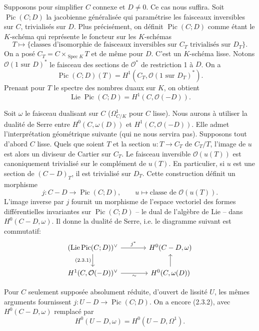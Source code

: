 \documentclass[11pt]{article}
\DeclareMathOperator{\Spec}{Spec}
\DeclareMathOperator{\Lie}{Lie}
\DeclareMathOperator{\Pic}{Pic}
\newcommand{\OO}{\mathcal O}
\newcommand{\dual}{^{\vee}}
\begin{document}
Supposons pour simplifier $C$ connexe et $D\ne0$. Ce cas nous suffira. Soit $\Pic(C;D)$ la jacobienne généralisée qui paramétrise les faisceaux inversibles sur $C$, trivialisés sur $D$. Plus précisément, on définit $\Pic(C;D)$ comme étant le $K$-schéma qui représente le foncteur sur les $K$-schémas
\[
        T\longmapsto\{
        \text{classes d'isomorphie de faisceaux inversibles sur } C_T
        \text{ trivialisés sur }D_T\}.
\]
On a posé $C_T=C\times_{\Spec K}T$ et de même pour $D$. C'est un $K$-schéma lisse. Notons $\OO(1\text{ sur }D)^*$ le faisceau des sections de $\OO^*$ de restriction 1 à $D$. On a
\[
        \Pic(C;D)(T)=H^1(C_T,\OO(1\text{ sur }D_T)^*).
\]
Prenant pour $T$ le spectre des nombres duaux sur $K$, on obtient
\begin{equation}
        \Lie\Pic(C;D)=H^1(C,\OO(-D)). \tag{2.3.1}
\end{equation}

Soit $\omega$ le faisceau dualisant sur $C$ ($\Omega^1_{C/K}$ pour $C$ lisse). Nous aurons à utiliser la dualité de Serre entre $H^0(C,\omega(D))$ et $H^1(C,\OO(-D))$. Elle admet l'interprétation géométrique suivante (qui ne nous servira pas). Supposons tout d'abord $C$ lisse. Quels que soient $T$ et la section $u:T\to C_T$ de $C_T/T$, l'image de $u$ est alors un diviseur de Cartier sur $C_T$. Le faisceau inversible $\OO(u(T))$ est canoniquement trivialisé sur le complément de $u(T)$. En particulier, si $u$ est une section de $(C-D)_T$, il est trivialisé sur $D_T$. Cette construction définit un morphisme
\begin{equation}
        j:C-D\longrightarrow\Pic(C;D),\qquad u\longmapsto\text{classe de }\OO(u(T)). \tag{2.3.2}
\end{equation}
L'image inverse par $j$ fournit un morphisme de l'espace vectoriel des formes différentielles invariantes sur $\Pic(C;D)$ -- le dual de l'algèbre de Lie -- dans $H^0(C-D,\omega)$. Il donne la dualité de Serre, i.e. le diagramme suivant est commutatif:
\[
\begin{tikzcd}[column sep=large]
(\Lie\Pic(C;D))\dual \arrow[r,"j^*"] \arrow[d,"{(2.3.1)}"'] & H^0(C-D,\omega) \\
H^1(C,\OO(-D))\dual \arrow[r,"\sim"'] & H^0(C,\omega(D)) \arrow[u]
\end{tikzcd}
\]

Pour $C$ seulement supposée absolument réduite, d'ouvert de lissité $U$, les mêmes arguments fournissent $j:U-D\to\Pic(C;D)$. On a encore (2.3.2), avec $H^0(C-D,\omega)$ remplacé par
\[
        H^0(U-D,\omega)=H^0(U-D,\Omega^1).
\]
\end{document}
